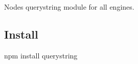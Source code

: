 \href{http://travis-ci.org/Gozala/querystring}{\tt }

\href{http://ci.testling.com/Gozala/querystring}{\tt }

Node\textquotesingle{}s querystring module for all engines.

\subsection*{Install}

\begin{DoxyVerb}npm install querystring\end{DoxyVerb}
 